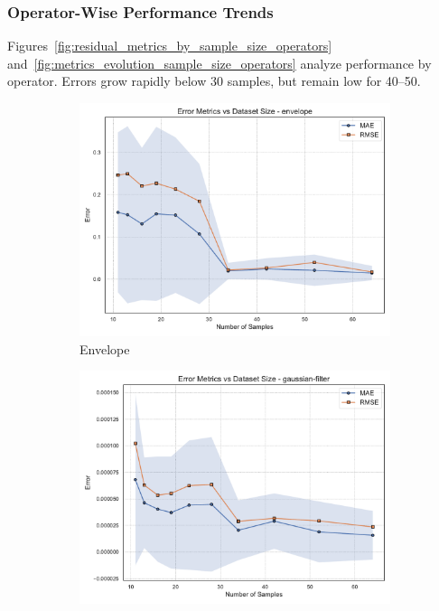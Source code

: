\subsubsection{Operator-Wise Performance Trends}
\label{subsec:operator-wise-sample-size-analysis}

Figures~\ref{fig:residual_metrics_by_sample_size_operators} and~\ref{fig:metrics_evolution_sample_size_operators} analyze performance by operator.
Errors grow rapidly below 30 samples, but remain low for 40--50.

\begin{figure}[htbp]
    \centering
    \begin{subfigure}[t]{0.32\textwidth}
        \includegraphics[width=\textwidth]{assets/images/05/residual_metrics_by_sample_size_envelope}
        \caption{Envelope}
    \end{subfigure}
    \hfill
    \begin{subfigure}[t]{0.32\textwidth}
        \includegraphics[width=\textwidth]{assets/images/05/residual_metrics_by_sample_size_gaussian-filter}

\end{subfigure}
\end{figure}
